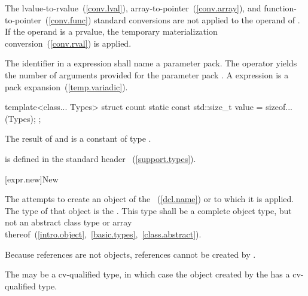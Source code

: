 \pnum
The lvalue-to-rvalue~(\ref{conv.lval}),
array-to-pointer~(\ref{conv.array}), and
function-to-pointer~(\ref{conv.func}) standard conversions are not
applied to the operand of .
If the operand is a prvalue,
the temporary materialization conversion~(\ref{conv.rval})
is applied.

\pnum
The identifier in a  expression shall name a parameter
pack. The  operator yields the number of arguments
provided for the parameter pack .
A  expression is a pack expansion~(\ref{temp.variadic}).
\begin{example}

\begin{codeblock}
template<class... Types>
struct count {
  static const std::size_t value = sizeof...(Types);
};
\end{codeblock}
\end{example}

\pnum
The result of  and  is a constant of type
.
\begin{note}
%
%
 is defined in the standard header
%
~(\ref{support.types}).
\end{note}

[expr.new]{New}

\pnum
{}%
%
%
%
%
The  attempts to create an object of the
~(\ref{dcl.name}) or  to which
it is applied. The type of that object is the .
%
This type shall be a complete object type, but not an abstract class
type or array
thereof~(\ref{intro.object},~\ref{basic.types},~\ref{class.abstract}).
\begin{note}
Because references are not objects, references cannot be created by
.
\end{note}
\begin{note}
The  may be a cv-qualified type, in which case the
object created by the  has a cv-qualified type.
\end{note}

